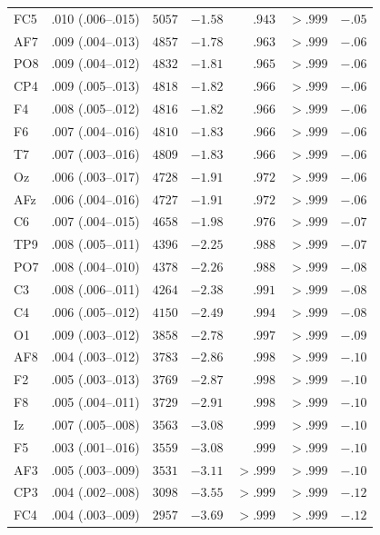{\begin{longtable}{llrrrrr}
FC5 & .010 (.006--.015) & $5057$ & $-1.58$ & $.943$ & $> .999$ & $-.05$ \\
AF7 & .009 (.004--.013) & $4857$ & $-1.78$ & $.963$ & $> .999$ & $-.06$ \\
PO8 & .009 (.004--.012) & $4832$ & $-1.81$ & $.965$ & $> .999$ & $-.06$ \\
CP4 & .009 (.005--.013) & $4818$ & $-1.82$ & $.966$ & $> .999$ & $-.06$ \\
F4 & .008 (.005--.012) & $4816$ & $-1.82$ & $.966$ & $> .999$ & $-.06$ \\
F6 & .007 (.004--.016) & $4810$ & $-1.83$ & $.966$ & $> .999$ & $-.06$ \\
T7 & .007 (.003--.016) & $4809$ & $-1.83$ & $.966$ & $> .999$ & $-.06$ \\
Oz & .006 (.003--.017) & $4728$ & $-1.91$ & $.972$ & $> .999$ & $-.06$ \\
AFz & .006 (.004--.016) & $4727$ & $-1.91$ & $.972$ & $> .999$ & $-.06$ \\
C6 & .007 (.004--.015) & $4658$ & $-1.98$ & $.976$ & $> .999$ & $-.07$ \\
TP9 & .008 (.005--.011) & $4396$ & $-2.25$ & $.988$ & $> .999$ & $-.07$ \\
PO7 & .008 (.004--.010) & $4378$ & $-2.26$ & $.988$ & $> .999$ & $-.08$ \\
C3 & .008 (.006--.011) & $4264$ & $-2.38$ & $.991$ & $> .999$ & $-.08$ \\
C4 & .006 (.005--.012) & $4150$ & $-2.49$ & $.994$ & $> .999$ & $-.08$ \\
O1 & .009 (.003--.012) & $3858$ & $-2.78$ & $.997$ & $> .999$ & $-.09$ \\
AF8 & .004 (.003--.012) & $3783$ & $-2.86$ & $.998$ & $> .999$ & $-.10$ \\
F2 & .005 (.003--.013) & $3769$ & $-2.87$ & $.998$ & $> .999$ & $-.10$ \\
F8 & .005 (.004--.011) & $3729$ & $-2.91$ & $.998$ & $> .999$ & $-.10$ \\
Iz & .007 (.005--.008) & $3563$ & $-3.08$ & $.999$ & $> .999$ & $-.10$ \\
F5 & .003 (.001--.016) & $3559$ & $-3.08$ & $.999$ & $> .999$ & $-.10$ \\
AF3 & .005 (.003--.009) & $3531$ & $-3.11$ & $> .999$ & $> .999$ & $-.10$ \\
CP3 & .004 (.002--.008) & $3098$ & $-3.55$ & $> .999$ & $> .999$ & $-.12$ \\
FC4 & .004 (.003--.009) & $2957$ & $-3.69$ & $> .999$ & $> .999$ & $-.12$ \\
\end{longtable}
}
